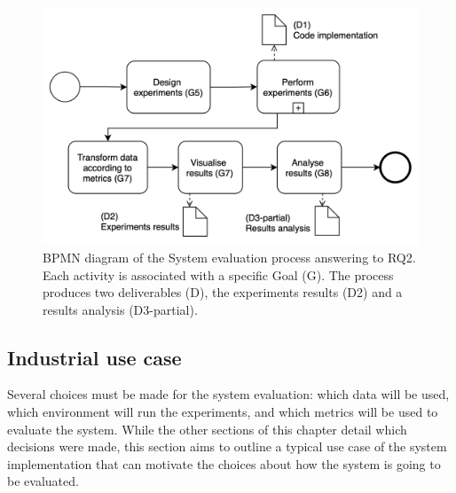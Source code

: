 \begin{figure}[!ht]
    \begin{center}
      \includegraphics[width=\textwidth]{figures/3-method/research_process_rq2.png}
    \caption[System evaluation process]{\gls{BPMN} diagram of the System evaluation process answering to RQ2. Each activity is associated with a specific Goal (\gls{G}). The process produces two deliverables (\gls{D}), the experiments results (D2) and a results analysis (D3-partial).}
    \label{fig:DevProcessRQ2}
    \end{center}
\end{figure}

\subsection{Industrial use case}
\label{subsec:use_case}

Several choices must be made for the system evaluation: which data will be used, which environment will run the experiments, and which metrics will be used to evaluate the system. While the other sections of this chapter detail which decisions were made, this section aims to outline a typical use case of the system implementation that can motivate the choices about how the system is going to be evaluated.

